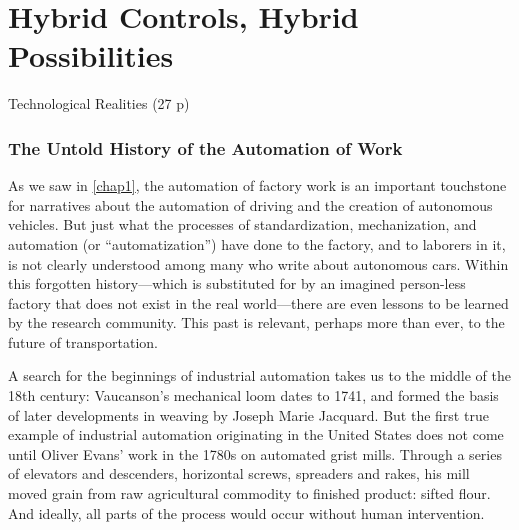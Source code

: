 \chapter{Hybrid Controls, Hybrid Possibilities}

Technological Realities (27 p)





\subsection{The Untold History of the Automation of Work}

As we saw in \ref{chap1}, the automation of factory work is an
important touchstone for narratives about the automation of driving
and the creation of autonomous vehicles. But just what the
processes of standardization, mechanization, and automation (or
``automatization'') have done to the factory, and to laborers in it, is
not clearly understood among many who write about autonomous cars. Within this
forgotten history---which is substituted for by an imagined person-less
factory that does not exist in the real world---there are even lessons to be
learned by the research community. This past is relevant, perhaps
more than ever, to the future of transportation.

A search for the beginnings of industrial automation takes us to the middle of
the 18th century: Vaucanson's mechanical loom dates to 1741, and formed the basis of
 later developments in weaving by Joseph Marie Jacquard.\cite[p. 9]{dieboldImpact} 
But the first true example of industrial automation originating in the
United States does not come until Oliver Evans' work in the 1780s on
automated grist mills.\cite[p. 5]{roesmithYankee} Through a series of elevators and descenders,
horizontal screws, spreaders and rakes, his mill moved grain from raw
agricultural commodity to finished product: sifted flour. And ideally,
all parts of the process would occur without human intervention. 

